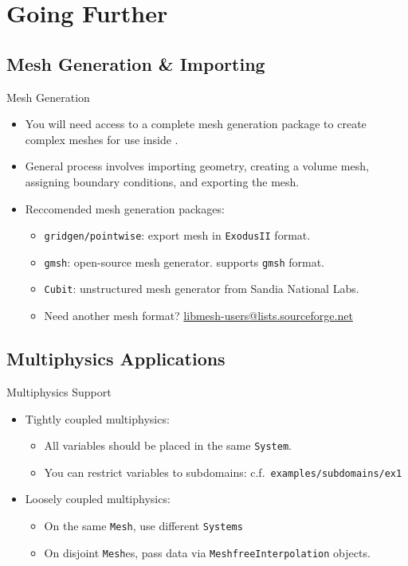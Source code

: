 \section{Going Further}

\subsection{Mesh Generation \& Importing}
\frame
{
  \begin{block}{Mesh Generation}
    \begin{itemize}
      \item You will need access to a complete mesh generation package to create complex meshes for use inside \libMesh{}.
      \item General process involves importing geometry, creating a volume mesh, assigning boundary conditions, and exporting the mesh.
      \item Reccomended mesh generation packages:
        \begin{itemize}
          \item \texttt{gridgen/pointwise}: export mesh in \texttt{ExodusII} format.
          \item \texttt{gmsh}: open-source mesh generator. \libMesh{} supports \texttt{gmsh} format.
          \item \texttt{Cubit}: unstructured mesh generator from Sandia National Labs.
          \item Need another mesh format? \url{libmesh-users@lists.sourceforge.net}
        \end{itemize}
    \end{itemize}
  \end{block}
}


\subsection{Multiphysics Applications}
\frame
{
  \begin{block}{Multiphysics Support}
    \begin{itemize}
      \item Tightly coupled multiphysics:
        \begin{itemize}
          \item All variables should be placed in the same \texttt{System}.
          \item You can restrict variables to subdomains: c.f.\ \texttt{examples/subdomains/ex1}
        \end{itemize}
        \item Loosely coupled multiphysics:
          \begin{itemize}
            \item On the same \texttt{Mesh}, use different \texttt{Systems}
            \item On disjoint \texttt{Mesh}es, pass data via \texttt{MeshfreeInterpolation} objects.
          \end{itemize}
    \end{itemize}
  \end{block}
}



